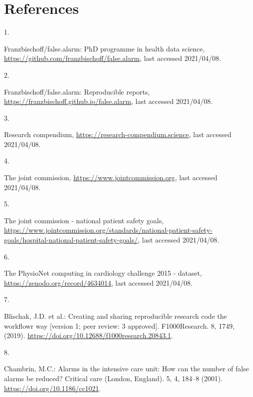 \documentclass[runningheads]{llncs}
\newlength{\cslhangindent}
\newlength{\csllabelwidth}
\newenvironment{CSLReferences}[2] %
 {%
  \setlength{\parindent}{0pt}
  \ifodd #1 \everypar{\setlength{\hangindent}{\cslhangindent}}\ignorespaces\fi
  \ifnum #2 > 0
  \setlength{\parskip}{#2\baselineskip}
  \fi
 }%
 {}
\newcommand{\CSLLeftMargin}[1]{\parbox[t]{\csllabelwidth}{#1}}
\newcommand{\CSLRightInline}[1]{\parbox[t]{\linewidth - \csllabelwidth}{#1}\break}
\begin{document}
\hypertarget{references}{%
\section*{References}\label{references}}

\hypertarget{refs}{}
\begin{CSLReferences}{0}{0}
\leavevmode{}%
\CSLLeftMargin{1. }
\CSLRightInline{Franzbischoff/false.alarm: PhD programme in health data
science, \url{https://github.com/franzbischoff/false.alarm}, last
accessed 2021/04/08.}

\leavevmode{}%
\CSLLeftMargin{2. }
\CSLRightInline{Franzbischoff/false.alarm: Reproducible reports,
\url{https://franzbischoff.github.io/false.alarm}, last accessed
2021/04/08.}

\leavevmode{}%
\CSLLeftMargin{3. }
\CSLRightInline{Research compendium,
\url{https://research-compendium.science}, last accessed 2021/04/08.}

\leavevmode{}%
\CSLLeftMargin{4. }
\CSLRightInline{The joint commission,
\url{https://www.jointcommission.org}, last accessed 2021/04/08.}

\leavevmode{}%
\CSLLeftMargin{5. }
\CSLRightInline{The joint commission - national patient safety goals,
\url{https://www.jointcommission.org/standards/national-patient-safety-goals/hospital-national-patient-safety-goals/},
last accessed 2021/04/08.}

\leavevmode{}%
\CSLLeftMargin{6. }
\CSLRightInline{The PhysioNet computing in cardiology challenge 2015 -
dataset, \url{https://zenodo.org/record/4634014}, last accessed
2021/04/08.}

\leavevmode{}%
\CSLLeftMargin{7. }
\CSLRightInline{Blischak, J.D. et al.: Creating and sharing reproducible
research code the workflowr way {[}version 1; peer review: 3
approved{]}. F1000Research. 8, 1749, (2019).
\url{https://doi.org/10.12688/f1000research.20843.1}.}

\leavevmode{}%
\CSLLeftMargin{8. }
\CSLRightInline{Chambrin, M.C.: Alarms in the intensive care unit: How
can the number of false alarms be reduced? Critical care (London,
England). 5, 4, 184--8 (2001). \url{https://doi.org/10.1186/cc1021}.}


\end{CSLReferences}
\end{document}
